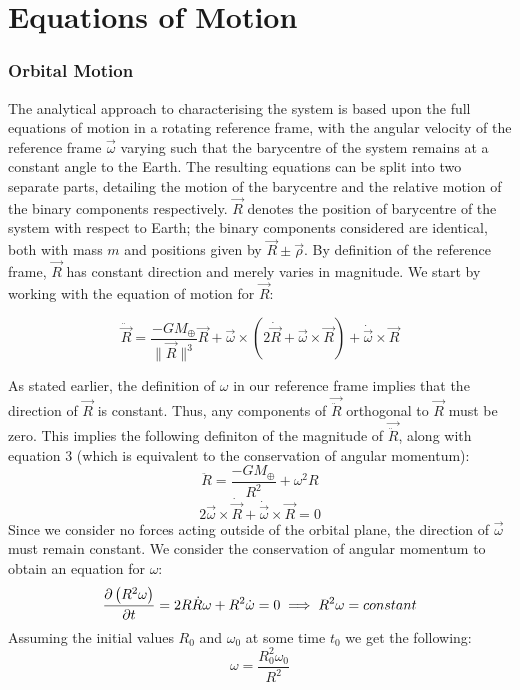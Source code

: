 \documentclass[letterpaper, preprint, paper,11pt]{AAS}	%
\begin{document}
\section{Equations of Motion}

\subsubsection{Orbital Motion}
The analytical approach to characterising the system is based upon the full equations of motion in a rotating reference frame, with the angular velocity of the reference frame $\vec{\omega}$ varying such that the barycentre of the system remains at a constant angle to the Earth. The resulting equations can be split into two separate parts, detailing the motion of the barycentre and the relative motion of the binary components respectively. $\vec{R}$ denotes the position of barycentre of the system with respect to Earth; the binary components considered are identical, both with mass $m$ and positions given by $\vec{R}\pm\vec{\rho}$. By definition of the reference frame, $\vec{R}$ has constant direction and merely varies in magnitude. We start by working with the equation of motion for $\vec{R}$:

\begin{equation}
\ddot{\vec{R}} = \frac{-GM_\oplus}{\|\vec{R}\|^{3}}\vec{R}+\vec{\omega}\times(2\dot{\vec{R}}+\vec{\omega}\times\vec{R})+\dot{\vec{\omega}}\times\vec{R}
\end{equation}

As stated earlier, the definition of $\omega$ in our reference frame implies that the direction of $\vec{R}$ is constant. Thus, any components of $\vec{\ddot{R}}$ orthogonal to $\vec{R}$ must be zero. This implies the following definiton of the magnitude of $\vec{\ddot{R}}$, along with equation 3 (which is equivalent to the conservation of angular momentum): 
\begin{equation}
\ddot{R} = \frac{-GM_\oplus}{R^{2}}+\omega^{2}R
\end{equation}
\begin{equation}
2\vec{\omega}\times\dot{\vec{R}}+\dot{\vec{\omega}}\times\vec{R}=0
\end{equation}
Since we consider no forces acting outside of the orbital plane, the direction of $\vec{\omega}$ must remain constant. We consider the conservation of angular momentum to obtain an equation for $\omega$:
\begin{equation}
\notag\frac{\partial\left(R^{2}\omega\right)}{\partial t} = 2R\dot{R}\omega + R^{2}\dot{\omega} = 0 \implies R^{2}\omega = constant
\end{equation}
Assuming the initial values $R_0$ and $\omega_0$ at some time $t_0$ we get the following:
\begin{equation}
\omega = \frac{R_0^{2}\omega_0}{R^{2}}
\end{equation}
\end{document}
